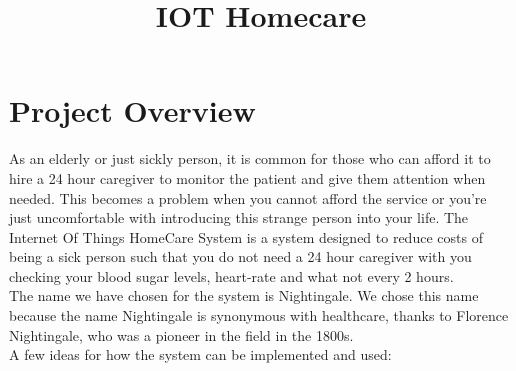 \documentclass[12pt]{article}
\title{IOT Homecare}
\begin{document}
    \newcommand{\titleimage}{iot.png}
    
    
    
	
	\newpage

	\section{Project Overview}
	As an elderly or just sickly person, it is common for those who can afford it to hire a 24 hour caregiver to monitor the patient and give them attention when needed. This becomes a problem when you cannot afford the service or you're just uncomfortable with introducing this strange person into your life. The Internet Of Things HomeCare System is a system designed to reduce costs of being a sick person such that you do not need a 24 hour caregiver with you checking your blood sugar levels, heart-rate and what not every 2 hours. \\
	
	The name we have chosen for the system is Nightingale. We chose this name because the name Nightingale is synonymous with healthcare, thanks to Florence Nightingale, who was a pioneer in the field in the 1800s.\\
	
	A few ideas for how the system can be implemented and used:
	
\end{document}
